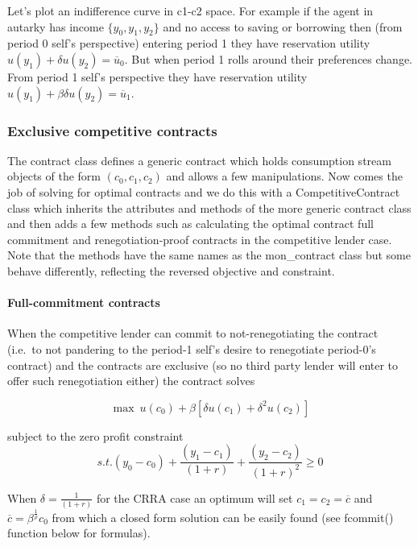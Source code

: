 \documentclass[11pt]{article}
\begin{document}
    Let's plot an indifference curve in c1-c2 space. For example if the
agent in autarky has income \(\{y_{0},y_{1},y_{2}\}\) and no access to
saving or borrowing then (from period 0 self's perspective) entering
period 1 they have reservation utility
\(u(y_{1})+\delta u(y_{2})=\overline{u}_{0}\). But when period 1 rolls
around their preferences change. From period 1 self's perspective they
have reservation utility
\(u(y_{1})+\beta \delta u(y_{2})=\overline{u}_{1}\).

    \hypertarget{exclusive-competitive-contracts}{%
\subsubsection{Exclusive competitive
contracts}\label{exclusive-competitive-contracts}}

    The contract class defines a generic contract which holds consumption
stream objects of the form \(\left( c_{0},c_{1},c_{2}\right)\) and
allows a few manipulations. Now comes the job of solving for optimal
contracts and we do this with a CompetitiveContract class which inherits
the attributes and methods of the more generic contract class and then
adds a few methods such as calculating the optimal contract full
commitment and renegotiation-proof contracts in the competitive lender
case. Note that the methods have the same names as the mon\_contract
class but some behave differently, reflecting the reversed objective and
constraint.

    \hypertarget{full-commitment-contracts}{%
\paragraph{Full-commitment contracts}\label{full-commitment-contracts}}

    When the competitive lender can commit to not-renegotiating the contract
(i.e.~to not pandering to the period-1 self's desire to renegotiate
period-0's contract) and the contracts are exclusive (so no third party
lender will enter to offer such renegotiation either) the contract
solves

\[\max \  u\left( c_{0}\right) +\beta \left[ \delta u\left( c_{1}\right) +\delta ^{2}u\left( c_{2}\right) \right] \]

subject to the zero profit constraint
\[s.t.  (y_{0}-c_{0})+\frac{(y_{1}-c_{1})}{(1+r)}+\frac{(y_{2}-c_{2})}{(1+r)^{2}}  \geq 0\]

When \(\delta =\frac{1}{(1+r)}\) for the CRRA case an optimum will set
\(c_{1}=c_{2}=\overline{c}\) and
\(\overline{c}=\beta ^{\frac{1}{\rho }}c_{0}\) from which a closed form
solution can be easily found (see fcommit() function below for
formulas).
\end{document}
